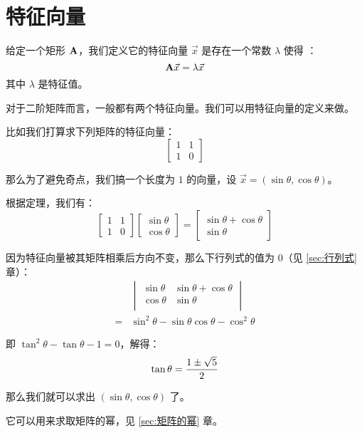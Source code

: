 \section{特征向量} \label{sec:特征向量}
给定一个矩形 $\mathbf{A}$，我们定义它的特征向量 $\vec{x}$ 是存在一个常数 $\lambda$ 使得
：\[ \mathbf{A} \vec{x} = \lambda \vec{x} \]其中 $\lambda$ 是特征值。

对于二阶矩阵而言，一般都有两个特征向量。我们可以用特征向量的定义来做。

比如我们打算求下列矩阵的特征向量：\[
    \begin{bmatrix}
        1 & 1 \\ 1 & 0
    \end{bmatrix}
\]

那么为了避免奇点，我们搞一个长度为 $1$ 的向量，设 $\vec x = (\sin \theta, \cos
\theta)$。

根据定理，我们有：\[
    \begin{bmatrix}
    1 & 1 \\
    1 & 0
    \end{bmatrix} \begin{bmatrix}
    \sin \theta \\ \cos \theta
    \end{bmatrix}
    =
    \begin{bmatrix}
    \sin \theta + \cos \theta \\ \sin \theta
    \end{bmatrix}
\]

因为特征向量被其矩阵相乘后方向不变，那么下行列式的值为 $0$（见 \ref{sec:行列式}
章）：\[\begin{aligned}
    & \begin{vmatrix}
        \sin \theta & \sin \theta + \cos \theta \\
        \cos \theta & \sin \theta \\
    \end{vmatrix} \\ = & {}\sin^2 \theta - \sin \theta \cos \theta - \cos^2 \theta
\end{aligned}\]

即 $\tan^2 \theta - \tan \theta - 1 = 0$，解得：\[
    \tan \theta = {1 \pm \sqrt 5 \over 2}
\]

那么我们就可以求出 $(\sin\theta, \cos\theta)$ 了。

它可以用来求取矩阵的幂，见 \ref{sec:矩阵的幂} 章。

